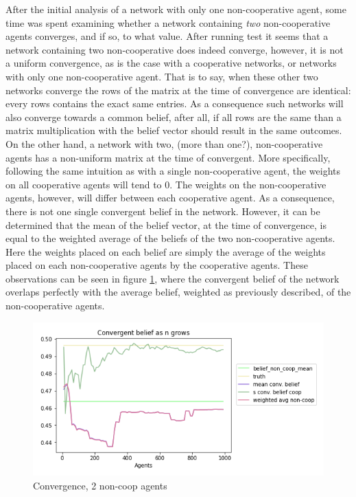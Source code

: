 \documentclass{article}
\begin{document}
After the initial analysis of a network with only one non-cooperative agent, some time was spent examining whether a network containing \emph{two} non-cooperative agents converges, and if so, to what value. After running test it seems that a network containing two non-cooperative does indeed converge, however, it is not a uniform convergence, as is the case with a cooperative networks, or networks with only one non-cooperative agent. That is to say, when these other two networks converge the rows of the matrix at the time of convergence are identical: every rows contains the exact same entries. As a consequence such networks will also converge towards a common belief, after all, if all rows are the same than a matrix multiplication with the belief vector should result in the same outcomes. On the other hand, a network with two, (more than one?), non-cooperative agents has a non-uniform matrix at the time of convergent. More specifically, following the same intuition as with a single non-cooperative agent, the weights on all cooperative agents will tend to 0. The weights on the non-cooperative agents, however, will differ between each cooperative agent.
As a consequence, there is not one single convergent belief in the network. However, it can be determined that the mean of the belief vector, at the time of convergence, is equal to the weighted average of the beliefs of the two non-cooperative agents. Here the weights placed on each belief are simply the average of the weights placed on each non-cooperative agents by the cooperative agents. These observations can be seen in figure \ref{non-coop:double}, where the convergent belief of the network overlaps perfectly with the average belief, weighted as previously described, of the non-cooperative agents. 

\begin{center}
    \begin{figure}[!htbp]
        \centering
        \includegraphics[width=.8\textwidth]{ThesisKI/Images/double_non_coop_convergence.png}
        \caption{Convergence, 2 non-coop agents}
        \label{non-coop:double}
    \end{figure}
\end{center}
\end{document}
